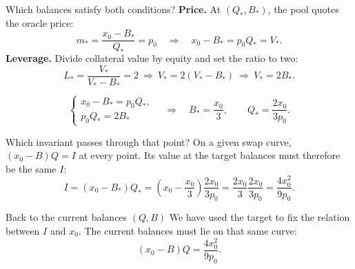 \documentclass[aspectratio=169,11pt]{beamer}
\begin{document}
\begin{frame}{Which balances satisfy both conditions?}
  \textbf{Price.} At $(Q_*,B_*)$, the pool quotes the oracle price:
  \begin{equation}\label{eq:target-price}
    m_*=\frac{x_0-B_*}{Q_*}=p_0
    \quad\Longrightarrow\quad x_0-B_*=p_0Q_*=V_*.
  \end{equation}
  \textbf{Leverage.} Divide collateral value by equity and set the ratio to two:
  \begin{equation}\label{eq:target-leverage}
    L_*=\frac{V_*}{V_*-B_*}=2
    \ \Longrightarrow\ V_*=2(V_*-B_*)
    \ \Longrightarrow\ V_*=2B_*.
  \end{equation}

  \begin{equation}\label{eq:target-balances}
    \begin{cases}
      x_0-B_*=p_0Q_*,\\
      p_0Q_*=2B_*
    \end{cases}
    \quad\Longrightarrow\quad
    \boxed{B_*=\frac{x_0}{3},\qquad Q_*=\frac{2x_0}{3p_0}.}
  \end{equation}
\end{frame}

\begin{frame}{Which invariant passes through that point?}
  On a given swap curve, $(x_0-B)Q=I$ at every point. Its value at the
  target balances must therefore be the same $I$:
  \begin{equation}\label{eq:calibrated-invariant}
    I=(x_0-B_*)Q_*
    =\left(x_0-\frac{x_0}{3}\right)\frac{2x_0}{3p_0}
    =\frac{2x_0}{3}\frac{2x_0}{3p_0}
    =\boxed{\frac{4x_0^2}{9p_0}}.
  \end{equation}
  \begin{block}{Back to the current balances $(Q,B)$}
    We have used the target to fix the relation between $I$ and $x_0$.
    The current balances must lie on that same curve:
    \begin{equation}\label{eq:current-invariant}
      (x_0-B)Q=\frac{4x_0^2}{9p_0}.
    \end{equation}
  \end{block}
\end{frame}
\end{document}
